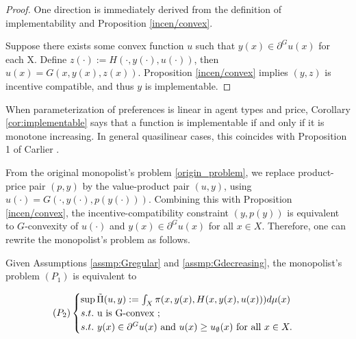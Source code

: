 {\begin{proof}%
	One direction is immediately derived from the definition of implementability and Proposition \ref{incen/convex}.
	
	Suppose there exists some convex function $u$ such that $y(x) \in \partial^G u(x)$ for each X. Define $z(\cdot):= H(\cdot, y(\cdot), u(\cdot))$, then $u(x) = G(x, y(x), z(x))$.
	Proposition \ref{incen/convex} implies $(y, z)$ is incentive compatible, and thus $y$ is implementable.
\end{proof}
}

When parameterization of preferences is linear in agent types and price, Corollary \ref{cor:implementable} says that a function is implementable if and only if it is monotone increasing. In general quasilinear cases, this coincides with Proposition 1 of Carlier \cite{Carlier01}. \medskip


From the original monopolist's problem \eqref{origin_problem}, we replace product-price pair $(p,y)$ by the value-product pair $(u,y)$, using $u(\cdot) = G(\cdot, y(\cdot), p(y(\cdot)))$. %
Combining this with Proposition \ref{incen/convex}, the incentive-compatibility constraint $(y,p(y))$ is equivalent to $G$-convexity of $u(\cdot)$ and $y(x) \in \partial^G u(x)$ for all $x\in X$. Therefore, one can rewrite the monopolist's problem as follows.

\begin{proposition}\label{equiv_form}
	
	Given Assumptions \ref{assmp:Gregular} and \ref{assmp:Gdecreasing}, the monopolist's problem $(P_1)$ is equivalent to
	
	\begin{equation}\label{Principal_new_problem}
	(P_2)
	\begin{cases}
	\sup \tilde{\Pi}(u,y):=\int_{X} \pi(x, y(x), H(x,y(x), u(x))) d\mu(x)\\
	s.t.\ $u$ \text{ is } $G$\text{-convex };\\
	s.t.\ y(x) \in \partial^G u(x) \text{ and }u(x)\ge u_{\emptyset}(x) \text{ for all } x \in X.
	\end{cases}
	\end{equation}
\end{proposition}


